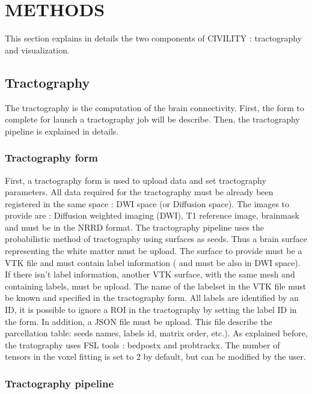 \documentclass[]{spie}  %
\begin{document}
\section{METHODS} 
\label{sec:METHODS}

This section explains in details the two components of CIVILITY : tractography and visualization.

\subsection{Tractography}

The tractography is the computation of the brain connectivity. First, the form to complete for launch a tractography job will be describe. Then, the tractography pipeline is explained in details.

\subsubsection{Tractography form}

First, a tractography form is used to upload data and set tractography parameters.
All data required for the tractography must be already been registered in the same space : DWI space (or Diffusion space). The images to provide are : Diffusion weighted imaging (DWI), T1 reference image, brainmask and must be in the NRRD format. The tractography pipeline uses the probabilistic method of tractography using surfaces as seeds. Thus a brain surface representing the white matter must be upload. The surface to provide must be a VTK file and must contain label information ( and must be also in DWI space). If there isn't label information, another VTK surface, with the same mesh and containing labels, must be upload. The name of the labelset in the VTK file must be known and specified in the tractography form. All labels are identified by an ID, it is possible to ignore a ROI in the tractography by setting the label ID in the form. 
In addition, a JSON file must be upload. This file describe the parcellation table: seeds names, labels id, matrix order, etc.). 
As explained before, the tratography uses FSL tools : bedpostx and probtrackx. The number of tensors in the voxel fitting is set to 2 by default, but can be modified by the user.

\subsubsection{Tractography pipeline}
\end{document}
